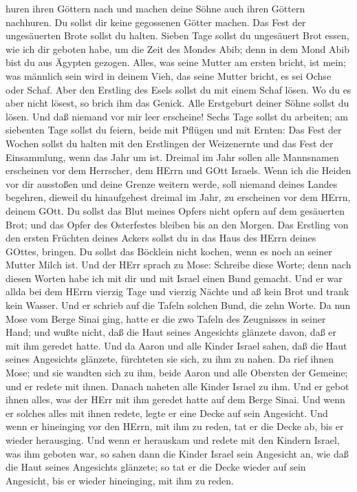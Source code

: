 huren ihren Göttern nach und machen deine Söhne auch ihren Göttern
nachhuren.  Du sollst dir keine gegossenen Götter machen.
 Das Fest der ungesäuerten Brote sollst du halten. Sieben
Tage sollst du ungesäuert Brot essen, wie ich dir geboten habe, um die
Zeit des Mondes Abib; denn in dem Mond Abib bist du aus Ägypten gezogen.
 Alles, was seine Mutter am ersten bricht, ist mein; was
männlich sein wird in deinem Vieh, das seine Mutter bricht, es sei Ochse
oder Schaf.  Aber den Erstling des Esels sollst du mit
einem Schaf lösen. Wo du es aber nicht lösest, so brich ihm das Genick.
Alle Erstgeburt deiner Söhne sollst du lösen. Und daß niemand vor mir
leer erscheine!  Sechs Tage sollst du arbeiten; am
siebenten Tage sollst du feiern, beide mit Pflügen und mit Ernten:
 Das Fest der Wochen sollst du halten mit den Erstlingen
der Weizenernte und das Fest der Einsammlung, wenn das Jahr um ist.
 Dreimal im Jahr sollen alle Mannsnamen erscheinen vor dem
Herrscher, dem HErrn und GOtt Israels.  Wenn ich die Heiden
vor dir ausstoßen und deine Grenze weitern werde, soll niemand deines
Landes begehren, dieweil du hinaufgehest dreimal im Jahr, zu erscheinen
vor dem HErrn, deinem GOtt.  Du sollst das Blut meines
Opfers nicht opfern auf dem gesäuerten Brot; und das Opfer des
Osterfestes bleiben bis an den Morgen.  Das Erstling von
den ersten Früchten deines Ackers sollst du in das Haus des HErrn deines
GOttes, bringen. Du sollst das Böcklein nicht kochen, wenn es noch an
seiner Mutter Milch ist.  Und der HErr sprach zu Mose:
Schreibe diese Worte; denn nach diesen Worten habe ich mit dir und mit
Israel einen Bund gemacht.  Und er war allda bei dem HErrn
vierzig Tage und vierzig Nächte und aß kein Brot und trank kein Wasser.
Und er schrieb auf die Tafeln solchen Bund, die zehn Worte.
 Da nun Mose vom Berge Sinai ging, hatte er die zwo Tafeln
des Zeugnisses in seiner Hand; und wußte nicht, daß die Haut seines
Angesichts glänzete davon, daß er mit ihm geredet hatte. 
Und da Aaron und alle Kinder Israel sahen, daß die Haut seines
Angesichts glänzete, fürchteten sie sich, zu ihm zu nahen. 
Da rief ihnen Mose; und sie wandten sich zu ihm, beide Aaron und alle
Obersten der Gemeine; und er redete mit ihnen.  Danach
naheten alle Kinder Israel zu ihm. Und er gebot ihnen alles, was der
HErr mit ihm geredet hatte auf dem Berge Sinai.  Und wenn
er solches alles mit ihnen redete, legte er eine Decke auf sein
Angesicht.  Und wenn er hineinging vor den HErrn, mit ihm
zu reden, tat er die Decke ab, bis er wieder herausging. Und wenn er
herauskam und redete mit den Kindern Israel, was ihm geboten war,
 so sahen dann die Kinder Israel sein Angesicht an, wie daß
die Haut seines Angesichts glänzete; so tat er die Decke wieder auf sein
Angesicht, bis er wieder hineinging, mit ihm zu reden.

